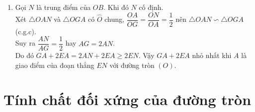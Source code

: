 \begin{bt}
{\begin{enumerate}
			\item Gọi $N$ là trung điểm của $OB$. Khi đó $N$ cố định.\\
			Xét $\triangle OAN$ và $\triangle OGA$ có $\widehat{O}$ chung, $\dfrac{OA}{OG}=\dfrac{ON}{OA}=\dfrac{1}{2}$ nên $\triangle OAN\backsim\triangle OGA$ (c.g.c).\\
			Suy ra $\dfrac{AN}{AG}=\dfrac{1}{2}$ hay $AG=2AN$.\\
			Do đó $GA+2EA=2AN+2EA\ge 2EN$. Vậy $GA+2EA$ nhỏ nhất khi $A$ là giao điểm của đoạn thẳng $EN$ với đường tròn $(O)$.
		\end{enumerate}
	}
\end{bt}

\section{Tính chất đối xứng của đường tròn}

